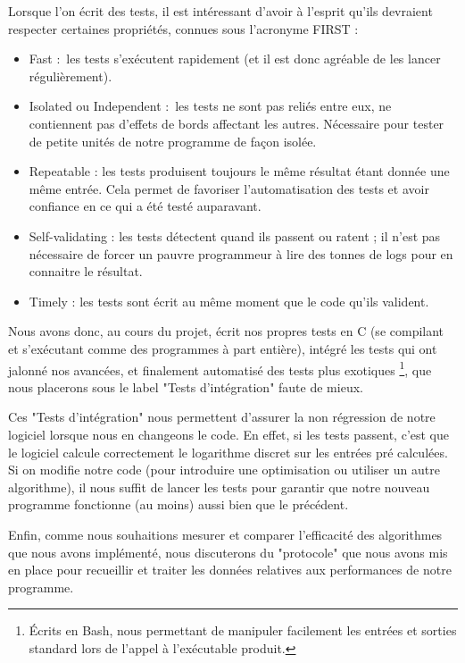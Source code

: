       Lorsque l'on écrit des tests, il est intéressant d'avoir à l'esprit qu'ils devraient respecter certaines propriétés, connues sous l'acronyme FIRST :
      \begin{itemize}
        \item Fast : les tests s'exécutent rapidement (et il est donc agréable de les lancer régulièrement).
        \item Isolated ou Independent : les tests ne sont pas reliés entre eux, ne contiennent pas d'effets de bords affectant les autres. Nécessaire pour tester de petite unités de notre programme de façon isolée.
        \item Repeatable : les tests produisent toujours le même résultat étant donnée une même entrée. Cela permet de favoriser l'automatisation des tests et avoir confiance en ce qui a été testé auparavant.
        \item Self-validating : les tests détectent quand ils passent ou ratent ; il n'est pas nécessaire de forcer un pauvre programmeur à lire des tonnes de logs pour en connaitre le résultat.
        \item Timely : les tests sont écrit au même moment que le code qu'ils valident.
      \end{itemize}

      Nous avons donc, au cours du projet, écrit nos propres tests en C (se compilant et s'exécutant comme des programmes à part entière), intégré les tests qui ont jalonné nos avancées, et finalement automatisé des tests plus exotiques \footnote{Écrits en Bash, nous permettant de manipuler facilement les entrées et sorties standard lors de l'appel à l'exécutable produit.}, que nous placerons sous le label "Tests d'intégration" faute de mieux.

      Ces "Tests d'intégration" nous permettent d'assurer la non régression de notre logiciel lorsque nous en changeons le code. En effet, si les tests passent, c'est que le logiciel calcule correctement le logarithme discret sur les entrées pré calculées. Si on modifie notre code (pour introduire une optimisation ou utiliser un autre algorithme), il nous suffit de lancer les tests pour garantir que notre nouveau programme fonctionne (au moins) aussi bien que le précédent.

      Enfin, comme nous souhaitions mesurer et comparer l'efficacité des algorithmes que nous avons implémenté, nous discuterons du "protocole" que nous avons mis en place pour recueillir et traiter les données relatives aux performances de notre programme.


